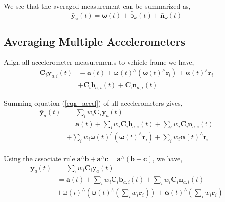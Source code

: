 \documentclass[conference]{IEEEtran}
\begin{document}
We see that the averaged measurement can be summarized as,
\begin{equation}
    \bar{\textbf{y}}_\omega(t) = \bm{\omega}(t) + \bar{\textbf{b}}_\omega(t) + \bar{\textbf{n}}_\omega(t)
\end{equation}

\subsection{Averaging Multiple Accelerometers}

Align all accelerometer measurements to vehicle frame we have,
\begin{equation}\label{eqn_accel}
\begin{split}
    \textbf{C}_{i} \textbf{y}_{a,i}(t) &= \textbf{a}(t) + \bm{\omega}(t)^\wedge (\bm{\omega}(t)^\wedge \textbf{r}_i) + \bm{\alpha}(t)^\wedge \textbf{r}_i \\
    &+ \textbf{C}_{i} \textbf{b}_{a,i}(t) + \textbf{C}_{i} \textbf{n}_{a,i}(t)
\end{split}
\end{equation}

Summing equation (\ref{eqn_accel}) of all accelerometers gives,
\begin{equation}
\begin{split}
    \bar{\textbf{y}}_a(t) &= \sum_i{w_i \textbf{C}_{i} \textbf{y}_a(t)} \\
    &= \textbf{a}(t) + \sum_i{w_i \textbf{C}_{i} \textbf{b}_{a,i}(t)} + \sum_i{w_i \textbf{C}_{i} \textbf{n}_{a,i}(t)} \\
    &+ \sum_i{w_i \bm{\omega}(t)^\wedge (\bm{\omega}(t)^\wedge \textbf{r}_i)} + \sum_i{w_i \bm{\alpha}(t)^\wedge \textbf{r}_i} \\
\end{split}
\end{equation}

Using the associate rule $\textbf{a}^\wedge \textbf{b} + \textbf{a}^\wedge \textbf{c} = \textbf{a}^\wedge \left(\textbf{b} + \textbf{c}\right)$, we have,
\begin{equation}
\begin{split}
    \bar{\textbf{y}}_a(t) &= \sum_i{w_i \textbf{C}_{i} \textbf{y}_a(t)} \\
    &= \textbf{a}(t) + \sum_i{w_i \textbf{C}_{i} \textbf{b}_{a,i}(t)} + \sum_i{w_i \textbf{C}_{i} \textbf{n}_{a,i}(t)} \\
    &+ \bm{\omega}(t)^\wedge \left(\bm{\omega}(t)^\wedge \left( \sum_i{w_i \textbf{r}_i} \right) \right) + \bm{\alpha}(t)^\wedge \left( \sum_i{w_i\textbf{r}_i} \right)\\
\end{split}
\end{equation}
\end{document}
